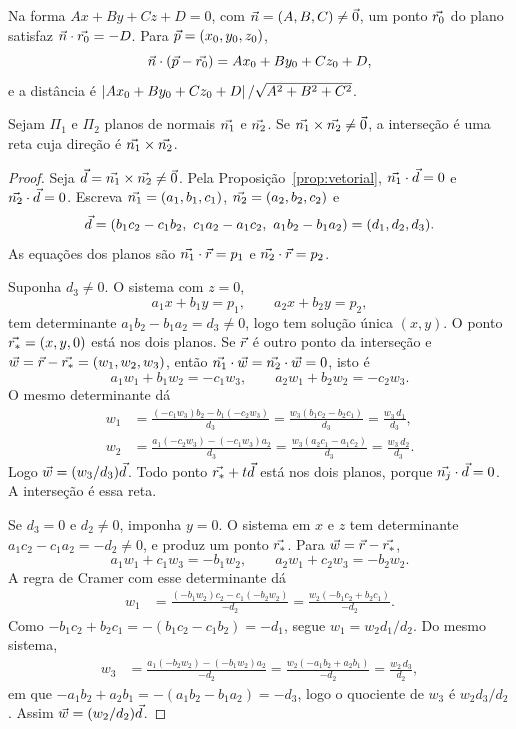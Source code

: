 \documentclass[11pt,a4paper]{article}
\begin{document}
Na forma $Ax+By+Cz+D=0$, com $\vec{n}=(A,B,C)\neq\vec{0}$, um ponto $\vec{r_0}$ do plano satisfaz $\vec{n}\cdot\vec{r_0}=-D$. Para $\vec{p}=(x_0,y_0,z_0)$,
\[
\vec{n}\cdot(\vec{p}-\vec{r_0})=Ax_0+By_0+Cz_0+D,
\]
e a distância é $\left\lvert Ax_0+By_0+Cz_0+D \right\rvert/\sqrt{A^2+B^2+C^2}$.

\begin{teorema}\label{teo:intersecao}
Sejam $\Pi_1$ e $\Pi_2$ planos de normais $\vec{n_1}$ e $\vec{n_2}$. Se $\vec{n_1}\times\vec{n_2}\neq\vec{0}$, a interseção é uma reta cuja direção é $\vec{n_1}\times\vec{n_2}$.
\end{teorema}

\begin{proof}
Seja $\vec{d}=\vec{n_1}\times\vec{n_2}\neq\vec{0}$. Pela Proposição~\ref{prop:vetorial}, $\vec{n_1}\cdot\vec{d}=0$ e $\vec{n_2}\cdot\vec{d}=0$. Escreva $\vec{n_1}=(a_1,b_1,c_1)$, $\vec{n_2}=(a_2,b_2,c_2)$ e
\[
\vet{d}=(b_1c_2-c_1b_2,\ c_1a_2-a_1c_2,\ a_1b_2-b_1a_2)=(d_1,d_2,d_3).
\]
As equações dos planos são $\vec{n_1}\cdot\vec{r}=p_1$ e $\vec{n_2}\cdot\vec{r}=p_2$.

Suponha $d_3\neq 0$. O sistema com $z=0$,
\[
a_1x+b_1y=p_1,\qquad a_2x+b_2y=p_2,
\]
tem determinante $a_1b_2-b_1a_2=d_3\neq 0$, logo tem solução única $(x,y)$. O ponto $\vec{r_*}=(x,y,0)$ está nos dois planos. Se $\vec{r}$ é outro ponto da interseção e $\vec{w}=\vec{r}-\vec{r_*}=(w_1,w_2,w_3)$, então $\vec{n_1}\cdot\vec{w}=\vec{n_2}\cdot\vec{w}=0$, isto é
\[
a_1w_1+b_1w_2=-c_1w_3,\qquad a_2w_1+b_2w_2=-c_2w_3.
\]
O mesmo determinante dá
\begin{align*}
w_1
&=\frac{(-c_1w_3)b_2-b_1(-c_2w_3)}{d_3}
=\frac{w_3(b_1c_2-b_2c_1)}{d_3}
=\frac{w_3\,d_1}{d_3},\\
w_2
&=\frac{a_1(-c_2w_3)-(-c_1w_3)a_2}{d_3}
=\frac{w_3(a_2c_1-a_1c_2)}{d_3}
=\frac{w_3\,d_2}{d_3}.
\end{align*}
Logo $\vec{w}=(w_3/d_3)\vec{d}$. Todo ponto $\vec{r_*}+t\vec{d}$ está nos dois planos, porque $\vec{n_j}\cdot\vec{d}=0$. A interseção é essa reta.

Se $d_3=0$ e $d_2\neq 0$, imponha $y=0$. O sistema em $x$ e $z$ tem determinante $a_1c_2-c_1a_2=-d_2\neq 0$, e produz um ponto $\vec{r_*}$. Para $\vec{w}=\vec{r}-\vec{r_*}$,
\[
a_1w_1+c_1w_3=-b_1w_2,\qquad a_2w_1+c_2w_3=-b_2w_2.
\]
A regra de Cramer com esse determinante dá
\begin{align*}
w_1
&=\frac{(-b_1w_2)c_2-c_1(-b_2w_2)}{-d_2}
=\frac{w_2(-b_1c_2+b_2c_1)}{-d_2}.
\end{align*}
Como $-b_1c_2+b_2c_1=-(b_1c_2-c_1b_2)=-d_1$, segue $w_1=w_2 d_1/d_2$. Do mesmo sistema,
\begin{align*}
w_3
&=\frac{a_1(-b_2w_2)-(-b_1w_2)a_2}{-d_2}
=\frac{w_2(-a_1b_2+a_2b_1)}{-d_2}
=\frac{w_2\,d_3}{d_2},
\end{align*}
em que $-a_1b_2+a_2b_1=-(a_1b_2-b_1a_2)=-d_3$, logo o quociente de $w_3$ é $w_2 d_3/d_2$. Assim $\vec{w}=(w_2/d_2)\vec{d}$.


\end{proof}
\end{document}
